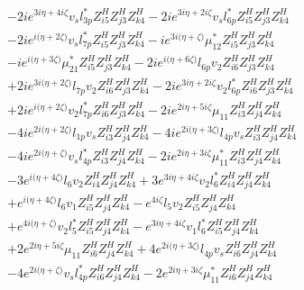 \begin{align}
 &-2 i e^{3 i \eta +4 i \zeta } v_s l_{3p}^* Z_{{i 5}}^{H} Z_{{j 3}}^{H} Z_{{k 4}}^{H} -2 i e^{3 i \eta +2 i \zeta } v_s l_{6p}^* Z_{{i 5}}^{H} Z_{{j 3}}^{H} Z_{{k 4}}^{H} \nonumber \\ 
 &-2 i e^{i \Big(\eta +2 \zeta \Big)} v_s l_{7p}^* Z_{{i 5}}^{H} Z_{{j 3}}^{H} Z_{{k 4}}^{H} -i e^{3 i \Big(\eta +\zeta \Big)} \mu_{12}^* Z_{{i 5}}^{H} Z_{{j 3}}^{H} Z_{{k 4}}^{H} \nonumber \\ 
 &-i e^{i \Big(\eta +3 \zeta \Big)} \mu_{21}^* Z_{{i 5}}^{H} Z_{{j 3}}^{H} Z_{{k 4}}^{H} -2 i e^{i \Big(\eta +6 \zeta \Big)} l_{6p} v_2 Z_{{i 6}}^{H} Z_{{j 3}}^{H} Z_{{k 4}}^{H} \nonumber \\ 
 &+2 i e^{3 i \Big(\eta +2 \zeta \Big)} l_{7p} v_2 Z_{{i 6}}^{H} Z_{{j 3}}^{H} Z_{{k 4}}^{H} -2 i e^{3 i \eta +2 i \zeta } v_2 l_{6p}^* Z_{{i 6}}^{H} Z_{{j 3}}^{H} Z_{{k 4}}^{H} \nonumber \\ 
 &+2 i e^{i \Big(\eta +2 \zeta \Big)} v_2 l_{7p}^* Z_{{i 6}}^{H} Z_{{j 3}}^{H} Z_{{k 4}}^{H} -2 i e^{2 i \eta +5 i \zeta } \mu_{11} Z_{{i 3}}^{H} Z_{{j 4}}^{H} Z_{{k 4}}^{H} \nonumber \\ 
 &-4 i e^{2 i \Big(\eta +2 \zeta \Big)} l_{1p} v_s Z_{{i 3}}^{H} Z_{{j 4}}^{H} Z_{{k 4}}^{H} -4 i e^{2 i \Big(\eta +3 \zeta \Big)} l_{4p} v_s Z_{{i 3}}^{H} Z_{{j 4}}^{H} Z_{{k 4}}^{H} \nonumber \\ 
 &-4 i e^{2 i \Big(\eta +\zeta \Big)} v_s l_{4p}^* Z_{{i 3}}^{H} Z_{{j 4}}^{H} Z_{{k 4}}^{H} -2 i e^{2 i \eta +3 i \zeta } \mu_{11}^* Z_{{i 3}}^{H} Z_{{j 4}}^{H} Z_{{k 4}}^{H} \nonumber \\ 
 &-3 e^{i \Big(\eta +4 \zeta \Big)} l_6 v_2 Z_{{i 4}}^{H} Z_{{j 4}}^{H} Z_{{k 4}}^{H} +3 e^{3 i \eta +4 i \zeta } v_2 l_6^* Z_{{i 4}}^{H} Z_{{j 4}}^{H} Z_{{k 4}}^{H} \nonumber \\ 
 &+e^{i \Big(\eta +4 \zeta \Big)} l_6 v_1 Z_{{i 5}}^{H} Z_{{j 4}}^{H} Z_{{k 4}}^{H} - e^{4 i \zeta } l_5 v_2 Z_{{i 5}}^{H} Z_{{j 4}}^{H} Z_{{k 4}}^{H} \nonumber \\ 
 &+e^{4 i \Big(\eta +\zeta \Big)} v_2 l_5^* Z_{{i 5}}^{H} Z_{{j 4}}^{H} Z_{{k 4}}^{H} - e^{3 i \eta +4 i \zeta } v_1 l_6^* Z_{{i 5}}^{H} Z_{{j 4}}^{H} Z_{{k 4}}^{H} \nonumber \\ 
 &+2 e^{2 i \eta +5 i \zeta } \mu_{11} Z_{{i 6}}^{H} Z_{{j 4}}^{H} Z_{{k 4}}^{H} +4 e^{2 i \Big(\eta +3 \zeta \Big)} l_{4p} v_s Z_{{i 6}}^{H} Z_{{j 4}}^{H} Z_{{k 4}}^{H} \nonumber \\ 
 &-4 e^{2 i \Big(\eta +\zeta \Big)} v_s l_{4p}^* Z_{{i 6}}^{H} Z_{{j 4}}^{H} Z_{{k 4}}^{H} -2 e^{2 i \eta +3 i \zeta } \mu_{11}^* Z_{{i 6}}^{H} Z_{{j 4}}^{H} Z_{{k 4}}^{H} \nonumber \\ 

\end{align}
